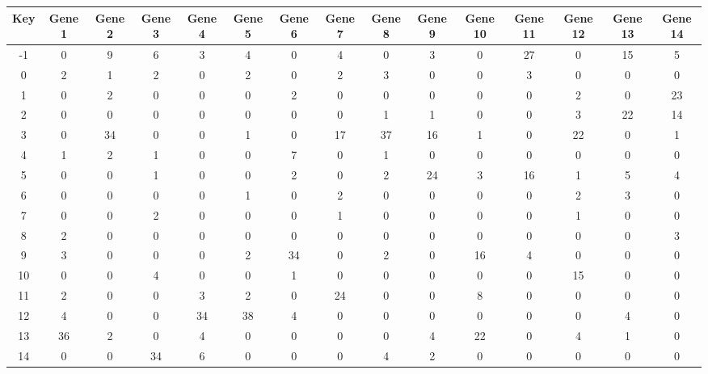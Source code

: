 \begin{tabular}{|c|c|c|c|c|c|c|c|c|c|c|c|c|c|c|}
\hline
Key & Gene 1 & Gene 2 & Gene 3 & Gene 4 & Gene 5 & Gene 6 & Gene 7 & Gene 8 & Gene 9 & Gene 10 & Gene 11 & Gene 12 & Gene 13 & Gene 14 \\
\hline
-1 & 0 & 9 & 6 & 3 & 4 & 0 & 4 & 0 & 3 & 0 & 27 & 0 & 15 & 5 \\
0 & 2 & 1 & 2 & 0 & 2 & 0 & 2 & 3 & 0 & 0 & 3 & 0 & 0 & 0 \\
1 & 0 & 2 & 0 & 0 & 0 & 2 & 0 & 0 & 0 & 0 & 0 & 2 & 0 & 23 \\
2 & 0 & 0 & 0 & 0 & 0 & 0 & 0 & 1 & 1 & 0 & 0 & 3 & 22 & 14 \\
3 & 0 & 34 & 0 & 0 & 1 & 0 & 17 & 37 & 16 & 1 & 0 & 22 & 0 & 1 \\
4 & 1 & 2 & 1 & 0 & 0 & 7 & 0 & 1 & 0 & 0 & 0 & 0 & 0 & 0 \\
5 & 0 & 0 & 1 & 0 & 0 & 2 & 0 & 2 & 24 & 3 & 16 & 1 & 5 & 4 \\
6 & 0 & 0 & 0 & 0 & 1 & 0 & 2 & 0 & 0 & 0 & 0 & 2 & 3 & 0 \\
7 & 0 & 0 & 2 & 0 & 0 & 0 & 1 & 0 & 0 & 0 & 0 & 1 & 0 & 0 \\
8 & 2 & 0 & 0 & 0 & 0 & 0 & 0 & 0 & 0 & 0 & 0 & 0 & 0 & 3 \\
9 & 3 & 0 & 0 & 0 & 2 & 34 & 0 & 2 & 0 & 16 & 4 & 0 & 0 & 0 \\
10 & 0 & 0 & 4 & 0 & 0 & 1 & 0 & 0 & 0 & 0 & 0 & 15 & 0 & 0 \\
11 & 2 & 0 & 0 & 3 & 2 & 0 & 24 & 0 & 0 & 8 & 0 & 0 & 0 & 0 \\
12 & 4 & 0 & 0 & 34 & 38 & 4 & 0 & 0 & 0 & 0 & 0 & 0 & 4 & 0 \\
13 & 36 & 2 & 0 & 4 & 0 & 0 & 0 & 0 & 4 & 22 & 0 & 4 & 1 & 0 \\
14 & 0 & 0 & 34 & 6 & 0 & 0 & 0 & 4 & 2 & 0 & 0 & 0 & 0 & 0 \\
\hline
\end{tabular}